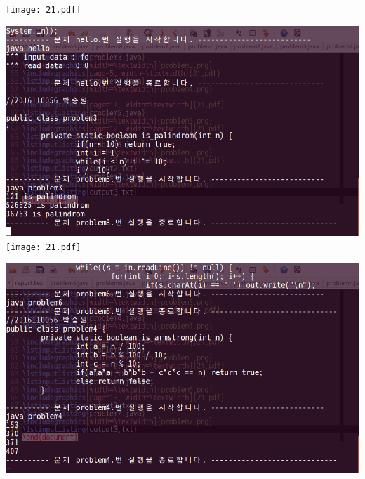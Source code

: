 \documentclass[12pt,a4paper]{article}
\begin{document}
\texttt{[image: 21.pdf]}

\includegraphics[width=\textwidth]{problem3.png}
\texttt{[image: 21.pdf]}

\includegraphics[width=\textwidth]{problem4.png}
\end{document}
